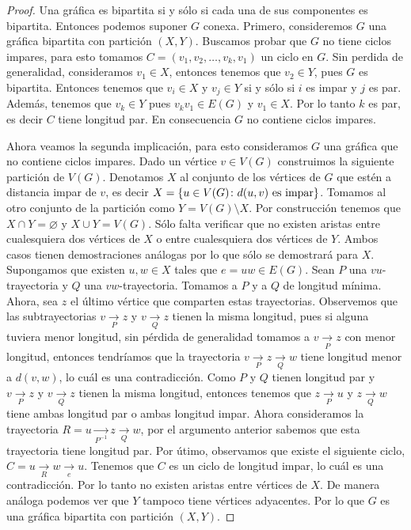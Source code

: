 \begin{proof}
    Una gr\'afica es bipartita si y s\'olo si cada una de sus componentes es
    bipartita. Entonces podemos suponer $G$ conexa. Primero, consideremos $G$
    una gr\'afica bipartita con partici\'on $(X,Y)$. Buscamos probar que $G$ no
    tiene ciclos impares, para esto tomamos $C=(v_1,v_2,\dots, v_k,v_1)$ un
    ciclo en $G$. Sin perdida de generalidad, consideramos $v_1 \in X$, entonces
    tenemos que $v_2 \in Y$, pues $G$ es bipartita. Entonces tenemos que $v_i
    \in X$ y $v_j \in Y$ si y s\'olo si $i$ es impar y $j$ es par. Adem\'as,
    tenemos que $v_k \in Y$ pues $v_k v_1 \in E(G)$ y $v_1 \in X$. Por lo tanto
    $k$ es par, es decir $C$ tiene longitud par. En consecuencia $G$ no contiene
    ciclos impares.

    Ahora veamos la segunda implicaci\'on, para esto consideramos $G$ una
    gr\'afica que no contiene ciclos impares. Dado un v\'ertice $v \in V(G)$
    construimos la siguiente partici\'on de $V(G)$. Denotamos $X$ al conjunto de
    los v\'ertices de $G$ que est\'en a distancia impar de $v$, es decir $X =
    \{u \in V(G) \colon d(u,v) \textnormal{ es impar}\}$. Tomamos al otro
    conjunto de la partici\'on como $Y = V(G)\setminus X$. Por construcci\'on
    tenemos que $X \cap Y = \varnothing$ y $X \cup Y = V(G)$. S\'olo falta
    verificar que no existen aristas entre cualesquiera dos v\'ertices de $X$ o
    entre cualesquiera dos v\'ertices de $Y$. Ambos casos tienen demostraciones
    an\'alogas por lo que s\'olo se demostrar\'a para $X$. Supongamos que
    existen $u,w \in X$ tales que $e=uw \in E(G)$. Sean $P$ una $vu$-trayectoria
    y $Q$ una $vw$-trayectoria. Tomamos a $P$ y a $Q$ de longitud m\'inima.
    Ahora, sea $z$ el \'ultimo v\'ertice que comparten estas trayectorias.
    Observemos que las subtrayectorias $v \xrightarrow[P]{}z$ y $v
    \xrightarrow[Q]{}z$ tienen la misma longitud, pues si alguna tuviera menor
    longitud, sin p\'erdida de generalidad tomamos a $v \xrightarrow[P]{}z$ con
    menor longitud, entonces tendr\'iamos que la trayectoria $v
    \xrightarrow[P]{}z\xrightarrow[Q]{}w$ tiene longitud menor a $d(v,w)$, lo
    cu\'al es una contradicci\'on. Como $P$ y $Q$ tienen longitud par y $v
    \xrightarrow[P]{}z$ y $v \xrightarrow[Q]{}z$ tienen la misma longitud,
    entonces tenemos que $z \xrightarrow[P]{}u$ y $z \xrightarrow[Q]{}w$ tiene
    ambas longitud par o ambas longitud impar. Ahora consideramos la trayectoria
    $ R= u \xrightarrow[P^{-1}]{}z \xrightarrow[Q]{}w$, por el argumento
    anterior sabemos que esta trayectoria tiene longitud par. Por \'utimo,
    observamos que existe el siguiente ciclo,
    $C=u\xrightarrow[R]{}w\xrightarrow[e]{}u$. Tenemos que $C$ es un ciclo de
    longitud impar, lo cu\'al es una contradicci\'on. Por lo tanto no existen
    aristas entre v\'ertices de $X$. De manera an\'aloga podemos ver que $Y$
    tampoco tiene v\'ertices adyacentes. Por lo que $G$ es una gr\'afica
    bipartita con partici\'on $(X,Y)$.
\end{proof}
    
